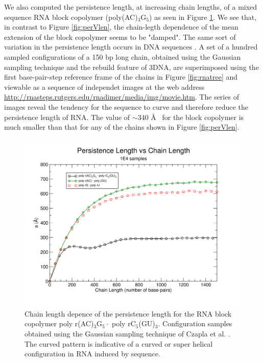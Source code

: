 We also computed the  persistence length, at increasing chain lengths,
of      a      mixed       sequence      RNA      block      copolymer
(poly(AC)$_{\text{3}}$G$_{\text{5}}$)     as     seen    in     Figure
\ref{fig:curved}.     We   see   that,    in   contrast    to   Figure
\ref{fig:perVlen}, the chain-legth dependence of the mean extension of
the block copolymer seems to  be "damped".  The same sort of variation
in    the    persistence    length    occurs    in    DNA    sequences
\cite{maroun1988b}. A set of a hundred sampled configurations of a 150
bp long chain, obtained using  the Gaussian sampling technique and the
rebuild   feature  of   3DNA,   are  superimposed   using  the   first
base-pair-step   reference    frame   of   the    chains   in   Figure
\ref{fig:rnatree} and  viewable as a sequence of  independet images at
the                             web                            address
\url{http://rnasteps.rutgers.edu/rnadimer/media/img/movie.htm}.     The
series of  images reveal  the tendency for  the sequence to  curve and
therefore reduce the persistence length of RNA. The value of $\sim$340
\AA~ for the block copolymer is  much smaller than that for any of the
chains shown in Figure \ref{fig:perVlen}.

\begin{figure}
\centering
\includegraphics[angle=0, scale=0.6]{Chapter4/curved_and_steps.png}
\caption{Chain length  depence of the  persistence length for  the RNA
  block  copolymer   poly  r(AC)$_{\text{3}}$G$_{\text{5}}\cdot$  poly
  rC$_{\text{5}}$(GU)$_{\text{3}}$. Configuration samples obtained
  using    the   Gaussian    sampling   technique    of    Czapla   et
  al. \cite{czapla2006}. The curved  pattern is indicative of a curved
  or super helical configuration in RNA induced by sequence.}
\label{fig:curved}
\end{figure}

